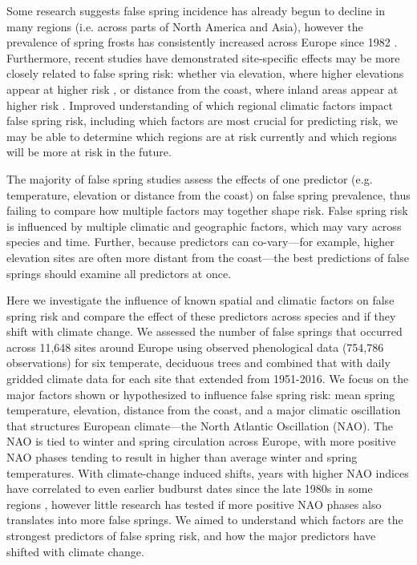 \documentclass{article}\usepackage[]{graphicx}\usepackage[]{color}
\begin{document}
Some research suggests false spring incidence has already begun to decline in many regions (i.e. across parts of North America and Asia), however the prevalence of spring frosts has consistently increased across Europe since 1982 \citep{Liu2018}. Furthermore, recent studies have demonstrated site-specific effects may be more closely related to false spring risk: whether via elevation, where higher elevations appear at higher risk \citep{Ma2018, Vitasse2018, Vitra2017}, or distance from the coast, where inland areas appear at higher risk \citep{ Ma2018, Wypych2016a}. Improved understanding of which regional climatic factors impact false spring risk, including which factors are most crucial for predicting risk, we may be able to determine which regions are at risk currently and which regions will be more at risk in the future.

The majority of false spring studies assess the effects of one predictor (e.g. temperature, elevation or distance from the coast) on false spring prevalence, thus failing to compare how multiple factors may together shape risk. False spring risk is influenced by multiple climatic and geographic factors, which may vary across species and time. Further, because predictors can co-vary---for example, higher elevation sites are often more distant from the coast---the best predictions of false springs should examine all predictors at once. 

Here we investigate the influence of known spatial and climatic factors on false spring risk \citep[defined here as when fell temperatures below -2.2$^{\circ}$ between estimated budburst and leafout][]{Schwartz1993} and compare the effect of these predictors across species and if they shift with climate change. We assessed the number of false springs that occurred across 11,648 sites around Europe using observed phenological data (754,786 observations) for six temperate, deciduous trees and combined that with daily gridded climate data for each site that extended from 1951-2016. We focus on the major factors shown or hypothesized to influence false spring risk: mean spring temperature, elevation, distance from the coast, and a major climatic oscillation that structures European climate---the North Atlantic Oscillation (NAO). The NAO  is tied to winter and spring circulation across Europe, with more positive NAO phases tending to result in higher than average winter and spring temperatures. With climate-change induced shifts, years with higher NAO indices have correlated to even earlier budburst dates since the late 1980s in some regions \citep{Chmielewski2001}, however little research has tested if more positive NAO phases also translates into more false springs. We aimed to understand which factors are the strongest predictors of false spring risk, and how the major predictors have shifted with climate change. 
\end{document}
